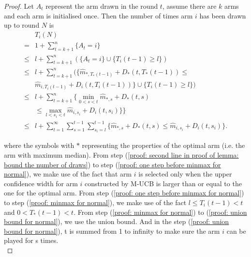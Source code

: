 \begin{proof}
Let $A_t$ represent the arm drawn in the round $t$, assume there are $k$ arms and each arm is initialised once. Then the number of times arm $i$ has been drawn up to round $N$ is
\begingroup
\allowdisplaybreaks
    \begin{align}
        & T_i\left(N\right) \nonumber\\
        =& 1 + \sum_{t = k + 1}^n \{A_t = i\}\\
\label{proof: second line in proof of lemma: bound the number of draws}
       \leq & l + \sum_{t = k + 1}^n \left(\{A_t = i\} \cup \{T_i\left(t-1\right) \geq l\}\right)\\
       \label{proof: one step before minmax for normal}
       \leq & l + \sum_{t = k + 1}^n (\{ \hat{m}_{*, T_*\left(t-1\right)} +  D_*\left(t, T_*\left(t-1\right)\right) \leq \nonumber\\
       &\hat{m}_{i, T_i\left(t-1\right)} +  D_i\left(t, T_i\left(t-1\right)\right)\} \cup \{ T_i\left(t-1\right) \geq l\})\\
       \label{proof: minmax for normal}
       \leq & l + \sum_{t = k + 1}^n \{ \min \limits_{0 < s < t}\hat{m}_{*, s} + D_*(t, s) \nonumber \\
       & \leq \max \limits_{l < s_i < t}\hat{m}_{i, s_i} +  D_i(t, s_i)\}\}\\
       \label{proof: union bound for normal}
       \leq & l + \sum_{t = 1}^\infty \sum_{s = 1}^{t-1} \sum_{s_i = l}^{t-1} \{\hat{m}_{*, s} + D_*(t, s)  \leq \hat{m}_{i, s_i} +  D_i(t, s_i)\}.
    \end{align}

    where the symbols with $*$ representing the properties of the optimal arm (i.e. the arm with maximum median).
    From step (\ref{proof: second line in proof of lemma: bound the number of draws}) to step (\ref{proof: one step before minmax for normal}), we make use of the fact that arm $i$ is selected only when the upper confidence width for arm $i$ constructed by M-UCB is larger than or equal to the one for the optimal arm.
    From step (\ref{proof: one step before minmax for normal}) to step (\ref{proof: minmax for normal}), we make use of the fact $l \leq T_i\left(t-1\right) < t$ and $0 < T_*\left(t-1\right) < t$. From step (\ref{proof: minmax for normal}) to (\ref{proof: union bound for normal}), we use the union bound. And in the step (\ref{proof: union bound for normal}), t is summed from 1 to infinity to make sure the arm $i$ can be played for s times.\\
\endgroup
\end{proof}

